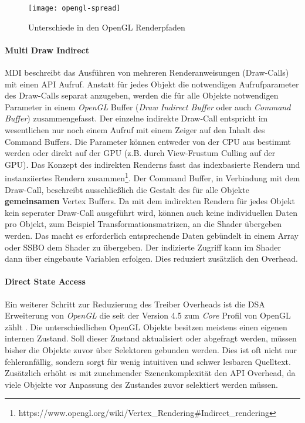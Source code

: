 \begin{figure}
	\texttt{[image: opengl-spread]}
	\caption[Unterschiede in den OpenGL Renderpfaden]{Unterschiede in den OpenGL Renderpfaden \parencite[Seite 98]{Everitt2014}}
	\label{fig:opengl-pfade}
\end{figure}

\paragraph{Multi Draw Indirect} 
\ac{MDI} beschreibt das Ausführen von mehreren Renderanweisungen (Draw-Calls) mit einen \ac{API} Aufruf. Anstatt für jedes Objekt die notwendigen Aufrufparameter des Draw-Calls separat anzugeben, werden die für alle Objekte notwendigen Parameter in einem \textit{OpenGL} Buffer (\textit{Draw Indirect Buffer} oder auch \textit{Command Buffer}) zusammengefasst. Der einzelne indirekte Draw-Call entspricht im wesentlichen nur noch einem Aufruf mit einem Zeiger auf den Inhalt des Command Buffers. Die Parameter können entweder von der CPU aus bestimmt werden oder direkt auf der GPU (z.B. durch View-Frustum Culling auf der GPU). Das Konzept des indirekten Renderns fasst das indexbasierte Rendern und instanziiertes Rendern zusammen\footnote{https://www.opengl.org/wiki/Vertex\_Rendering\#Indirect\_rendering}. Der Command Buffer, in Verbindung mit dem Draw-Call, beschreibt ausschließlich die Gestalt des für alle Objekte \textbf{gemeinsamen} Vertex Buffers. Da mit dem indirekten Rendern für jedes Objekt kein seperater Draw-Call ausgeführt wird, können auch keine individuellen Daten pro Objekt, zum Beispiel Transformationsmatrizen, an die Shader übergeben werden. Das macht es erforderlich entsprechende Daten gebündelt in einem Array oder \ac{SSBO} dem Shader zu übergeben. Der indizierte Zugriff kann im Shader dann über eingebaute Variablen erfolgen. Dies reduziert zusätzlich den Overhead.

\paragraph{Direct State Access} Ein weiterer Schritt zur Reduzierung des Treiber Overheads ist die \ac{DSA} Erweiterung von \textit{OpenGL} die seit der Version 4.5 zum \textit{Core} Profil von OpenGL zählt \parencite{Akeley2015}. Die unterschiedlichen OpenGL Objekte besitzen meistens einen eigenen internen Zustand. Soll dieser Zustand aktualisiert oder abgefragt werden, müssen bisher die Objekte zuvor über Selektoren gebunden werden. Dies ist oft nicht nur fehleranfällig, sondern sorgt für wenig intuitiven und schwer lesbaren Quelltext. Zusätzlich erhöht es mit zunehmender Szenenkomplexität den \ac{API} Overhead, da viele Objekte vor Anpassung des Zustandes zuvor selektiert werden müssen.

